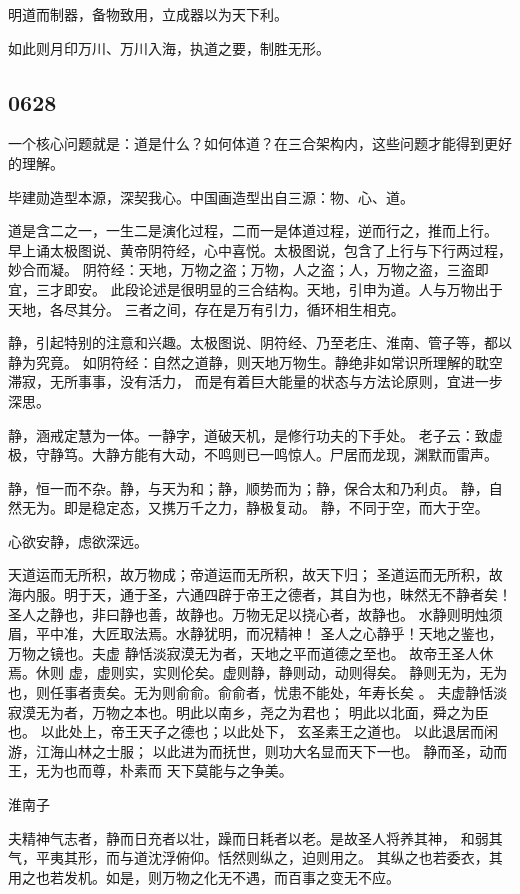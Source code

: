 明道而制器，备物致用，立成器以为天下利。

如此则月印万川、万川入海，执道之要，制胜无形。

\subsection{0628}

一个核心问题就是：道是什么？如何体道？在三合架构内，这些问题才能得到更好的理解。

毕建勋造型本源，深契我心。中国画造型出自三源：物、心、道。

道是含二之一，一生二是演化过程，二而一是体道过程，逆而行之，推而上行。
早上诵太极图说、黄帝阴符经，心中喜悦。太极图说，包含了上行与下行两过程，妙合而凝。
阴符经：天地，万物之盗；万物，人之盗；人，万物之盗，三盗即宜，三才即安。
此段论述是很明显的三合结构。天地，引申为道。人与万物出于天地，各尽其分。
三者之间，存在是万有引力，循环相生相克。

静，引起特别的注意和兴趣。太极图说、阴符经、乃至老庄、淮南、管子等，都以静为究竟。
如阴符经：自然之道静，则天地万物生。静绝非如常识所理解的耽空滞寂，无所事事，没有活力，
而是有着巨大能量的状态与方法论原则，宜进一步深思。

静，涵戒定慧为一体。一静字，道破天机，是修行功夫的下手处。
老子云：致虚极，守静笃。大静方能有大动，不鸣则已一鸣惊人。尸居而龙现，渊默而雷声。

静，恒一而不杂。静，与天为和；静，顺势而为；静，保合太和乃利贞。
静，自然无为。即是稳定态，又携万千之力，静极复动。
静，不同于空，而大于空。

心欲安静，虑欲深远。

\begin{shadequote}
天道运而无所积，故万物成；帝道运而无所积，故天下归；
圣道运而无所积，故海内服。明于天，通于圣，六通四辟于帝王之德者，其自为也，昧然无不静者矣！
圣人之静也，非曰静也善，故静也。万物无足以挠心者，故静也。
水静则明烛须眉，平中准，大匠取法焉。水静犹明，而况精神！
圣人之心静乎！天地之鉴也，万物之镜也。夫虚 静恬淡寂漠无为者，天地之平而道德之至也。
故帝王圣人休焉。休则 虚，虚则实，实则伦矣。虚则静，静则动，动则得矣。
静则无为，无为也，则任事者责矣。无为则俞俞。俞俞者，忧患不能处，年寿长矣 。
夫虚静恬淡寂漠无为者，万物之本也。明此以南乡，尧之为君也； 明此以北面，舜之为臣也。
以此处上，帝王天子之德也；以此处下， 玄圣素王之道也。
以此退居而闲游，江海山林之士服；
以此进为而抚世，则功大名显而天下一也。
静而圣，动而王，无为也而尊，朴素而 天下莫能与之争美。
\end{shadequote}

淮南子
\begin{shadequote}
夫精神气志者，静而日充者以壮，躁而日耗者以老。是故圣人将养其神，
和弱其气，平夷其形，而与道沈浮俯仰。恬然则纵之，迫则用之。
其纵之也若委衣，其用之也若发机。如是，则万物之化无不遇，而百事之变无不应。
\end{shadequote}

